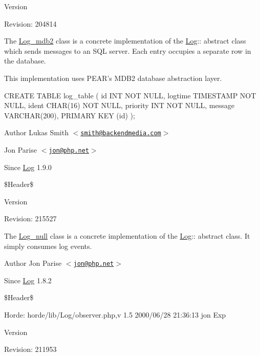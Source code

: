 \begin{DoxyVersion}{Version}

\end{DoxyVersion}
\begin{DoxyParagraph}{Revision:}
204814 
\end{DoxyParagraph}


The \hyperlink{class_log__mdb2}{Log\_\-mdb2} class is a concrete implementation of the \hyperlink{class_log}{Log}:: abstract class which sends messages to an SQL server. Each entry occupies a separate row in the database.

This implementation uses PEAR's MDB2 database abstraction layer.

CREATE TABLE log\_\-table ( id INT NOT NULL, logtime TIMESTAMP NOT NULL, ident CHAR(16) NOT NULL, priority INT NOT NULL, message VARCHAR(200), PRIMARY KEY (id) );

\begin{DoxyAuthor}{Author}
Lukas Smith $<$\href{mailto:smith@backendmedia.com}{\tt smith@backendmedia.com}$>$ 

Jon Parise $<$\href{mailto:jon@php.net}{\tt jon@php.net}$>$ 
\end{DoxyAuthor}
\begin{DoxySince}{Since}
\hyperlink{class_log}{Log} 1.9.0
\end{DoxySince}
\$Header\$

\begin{DoxyVersion}{Version}

\end{DoxyVersion}
\begin{DoxyParagraph}{Revision:}
215527 
\end{DoxyParagraph}


The \hyperlink{class_log__null}{Log\_\-null} class is a concrete implementation of the \hyperlink{class_log}{Log}:: abstract class. It simply consumes log events.

\begin{DoxyAuthor}{Author}
Jon Parise $<$\href{mailto:jon@php.net}{\tt jon@php.net}$>$ 
\end{DoxyAuthor}
\begin{DoxySince}{Since}
\hyperlink{class_log}{Log} 1.8.2
\end{DoxySince}
\$Header\$ \begin{DoxyParagraph}{Horde:}
horde/lib/Log/observer.php,v 1.5 2000/06/28 21:36:13 jon Exp 
\end{DoxyParagraph}


\begin{DoxyVersion}{Version}

\end{DoxyVersion}
\begin{DoxyParagraph}{Revision:}
211953 
\end{DoxyParagraph}


